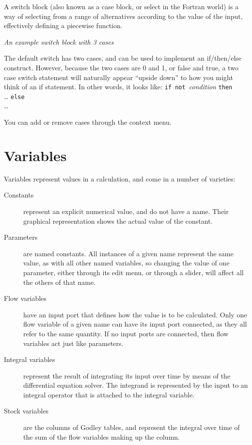 A switch block (also known as a case block, or select in the Fortran
world) is a way of selecting from a range of alternatives according
to the value of the input, effectively defining a piecewise function.

\begin{center}
{\em An example switch block with 3 cases}
\end{center}

The default switch has two cases, and can be used to implement an
if/then/else construct. However, because the two cases are 0 and 1,
or false and true, a two case switch statement will naturally appear
``upside down'' to how you might think of an if statement. In other
words, it looks like:
{\tt if not }{\em condition} {\tt then}\\
 \ldots
{\tt else}\\
\ldots

You can add or remove cases through the context menu. 

\section{Variables}

Variables represent values in a calculation, and come in a number of
varieties:
\begin{description}
\item[Constants] represent an explicit numerical value, and do not
have a name. Their graphical representation shows the actual value of
the constant.
\item[Parameters] are named constants. All instances of a given name
represent the same value, as with all other named variables, so
changing the value of one parameter, either through its edit menu, or
through a slider, will affect all the others of that name.
\item[Flow variables] have an input port that defines how the value is
to be calculated. Only one flow variable of a given name can have its
input port connected, as they all refer to the same quantity. If no
input ports are connected, then flow variables act just like
parameters.
\item[Integral variables] represent the result of integrating its
input over time  by means of the differential
equation solver. The integrand is represented by the input to an
integral operator that is attached to the integral variable.
\item[Stock variables] are the columns of Godley tables, and represent
the integral over time of the sum of the flow variables making up the
column.
\end{description}

